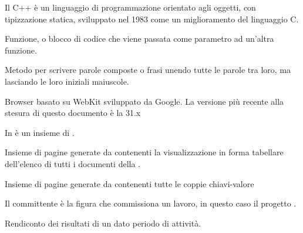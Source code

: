 \begin{itemize}


Il C++ è un linguaggio di programmazione orientato agli oggetti, con tipizzazione statica, sviluppato nel 1983 come un miglioramento del linguaggio C.


Funzione, o blocco di codice che viene passata come parametro ad un'altra funzione.


Metodo per scrivere parole composte o frasi unendo tutte le parole tra loro, ma lasciando le loro iniziali maiuscole. \\


Browser basato su WebKit sviluppato da Google. La versione più recente alla stesura di questo documento è la 31.x \\


In  è un insieme di .


Insieme di pagine generate da \ProjectName{} contenenti la visualizzazione in forma tabellare dell'elenco di tutti i documenti della  .


Insieme di pagine generate da \ProjectName{} contenenti tutte le coppie chiavi-valore


Il committente è la figura che commissiona un lavoro, in questo caso il progetto \ProjectName{}.


Rendiconto  dei risultati di un dato periodo di attività.

\end{itemize}


